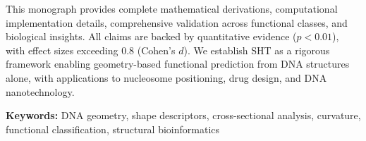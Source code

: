 \vspace{0.5cm}

This monograph provides complete mathematical derivations, computational implementation details, comprehensive validation across functional classes, and biological insights. All claims are backed by quantitative evidence ($p < 0.01$), with effect sizes exceeding 0.8 (Cohen's $d$). We establish SHT as a rigorous framework enabling geometry-based functional prediction from DNA structures alone, with applications to nucleosome positioning, drug design, and DNA nanotechnology.

\vspace{0.5cm}

\noindent\textbf{Keywords:} DNA geometry, shape descriptors, cross-sectional analysis, curvature, functional classification, structural bioinformatics

\vspace{2cm}
